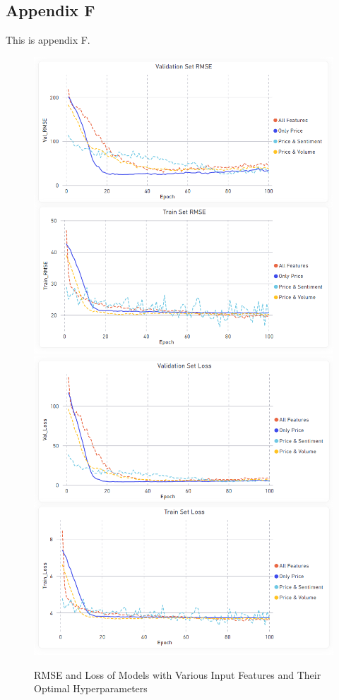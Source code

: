 \documentclass[11pt, a4paper]{article}
\begin{document}
\subsection{Appendix F}
\label{appendix:lstm_models_rmse_loss}
This is appendix F.
\begin{figure}[!hb]
    \centering
    \includegraphics[scale = 0.4]{Best_Params_Of_Model_RMSE.png}
    \includegraphics[scale = 0.4]{Best_Params_Of_Model_Loss.png}
    \caption{RMSE and Loss of Models with Various Input Features and Their Optimal Hyperparameters}
    \label{fig:lstm_models_rmse_loss}
\end{figure}
\end{document}
